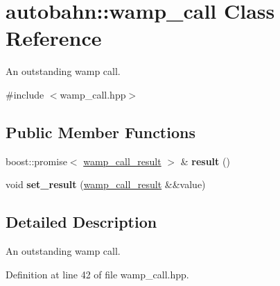 \hypertarget{classautobahn_1_1wamp__call}{}\section{autobahn\+:\+:wamp\+\_\+call Class Reference}
\label{classautobahn_1_1wamp__call}


An outstanding wamp call.  




{\ttfamily \#include $<$wamp\+\_\+call.\+hpp$>$}

\subsection*{Public Member Functions}
\begin{DoxyCompactItemize}
\item 
boost\+::promise$<$ \hyperlink{classautobahn_1_1wamp__call__result}{wamp\+\_\+call\+\_\+result} $>$ \& {\bfseries result} ()\hypertarget{classautobahn_1_1wamp__call_a263297009ad4278d2c96a3ed8c98b366}{}\label{classautobahn_1_1wamp__call_a263297009ad4278d2c96a3ed8c98b366}

\item 
void {\bfseries set\+\_\+result} (\hyperlink{classautobahn_1_1wamp__call__result}{wamp\+\_\+call\+\_\+result} \&\&value)\hypertarget{classautobahn_1_1wamp__call_a58a9d77418091dc6cab249f54c987d8a}{}\label{classautobahn_1_1wamp__call_a58a9d77418091dc6cab249f54c987d8a}

\end{DoxyCompactItemize}


\subsection{Detailed Description}
An outstanding wamp call. 

Definition at line 42 of file wamp\+\_\+call.\+hpp.

